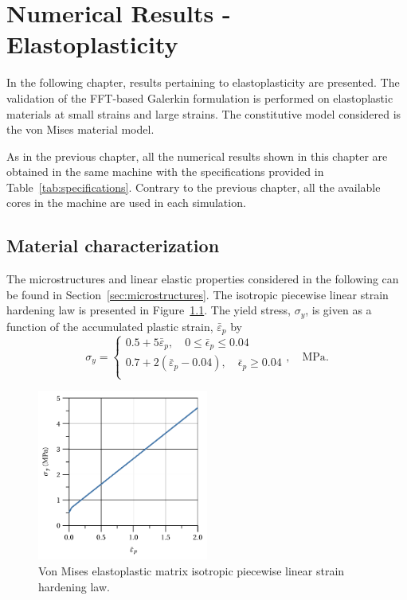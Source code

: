 \chapter{Numerical Results - Elastoplasticity} \label{chapter:numerical_results_elastoplasticity}

In the following chapter, results pertaining to elastoplasticity are presented.
The validation of the FFT-based Galerkin formulation is performed on elastoplastic materials at
small strains and large strains.
The constitutive model considered is the von Mises material model.

As in the previous chapter, all the numerical results shown in this chapter are obtained
in the same machine with the specifications provided in Table~\ref{tab:specifications}.
Contrary to the previous chapter, all the available cores in the machine are used in each simulation.

\section{Material characterization}

The microstructures and linear elastic properties considered in the following can be found in Section~\ref{sec:microstructures}.
The isotropic piecewise linear strain hardening law is presented in Figure~\ref{fig:von_mises_res_mat_small_strain_2D_normal_hardening_curve}.
The yield stress, \(\sigma_y\), is given as a function of the accumulated plastic strain, \(\bar{\varepsilon}_p\) by
\begin{equation}
\label{von_mises_hardening_curve}
  \sigma_y = \begin{cases}
    0.5 + 5\bar{\varepsilon}_p,\quad 0 \leq \bar{\epsilon}_p \leq 0.04\\
    0.7 + 2(\bar{\varepsilon}_p-0.04),\quad \bar{\epsilon}_p \geq 0.04\\
  \end{cases},\quad\si{\mega\pascal}.
\end{equation}

\begin{figure}[hbtp]
  \centering
  \includegraphics[width=0.5\textwidth]{figures/von_mises_res_mat_small_strain_2D_normal_hardening_curve}
  \caption{Von Mises elastoplastic matrix isotropic piecewise linear strain hardening law.}
\label{fig:von_mises_res_mat_small_strain_2D_normal_hardening_curve}
\end{figure}

